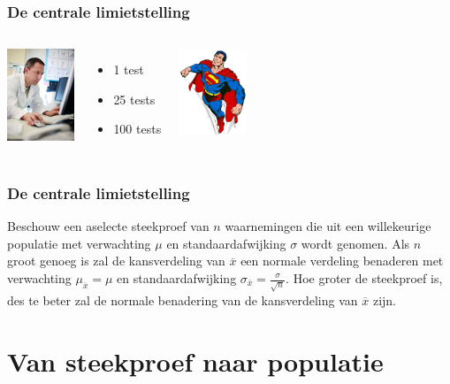 \documentclass{beamer}
\begin{document}
\begin{frame}
  \frametitle{De centrale limietstelling}


  \vfill

  \begin{columns}[c]
    \includegraphics[width=2cm]{img/les4-centrlimiet}
    \begin{itemize}
      \item 1 test
      \item 25 tests
      \item 100 tests
    \end{itemize}
    \includegraphics[width=2cm]{img/les2-hero-3}
  \end{columns}

\end{frame}

\begin{frame}
  \frametitle{De centrale limietstelling}
  Beschouw een aselecte steekproef van $n$ waarnemingen die uit een willekeurige populatie met verwachting $\mu$ en standaardafwijking $\sigma$ wordt genomen. Als $n$ groot genoeg is zal de kansverdeling van $\overline{x}$ een normale verdeling benaderen met verwachting $\mu_{\overline{x}} = \mu$ en standaardafwijking $\sigma_{\overline{x}} = \frac{\sigma}{\sqrt{n}}$. Hoe groter de steekproef is, des te beter zal de normale benadering van de kansverdeling van $\overline{x}$ zijn.
\end{frame}

\section{Van steekproef naar populatie}
\sectionframelogo{}
\end{document}
